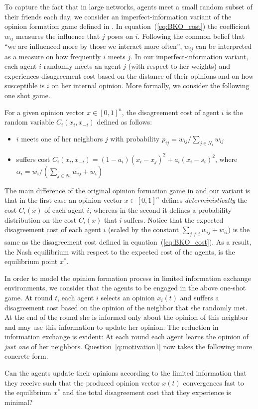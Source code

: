To capture the fact that in large networks, agents meet a small random subset of
their friends each day, we consider an imperfect-information variant of the
opinion formation game defined in \cite{BKO11}. In equation~(\ref{eq:BKO_cost})
the coefficient $w_{ij}$ measures the influence that $j$ poses on $i$.
Following the common belief that \enquote{we are influenced more by
those we interact more often}, $w_{ij}$ can be interpreted as
a measure on how frequently $i$ meets $j$. In our imperfect-information
variant, each agent $i$ randomly meets an agent $j$ (with respect to her weights)
and experiences disagreement cost based on the distance of their opinions and on
how susceptible is $i$ on her internal opinion. More formally, we consider the
following one shot game.
%
\begin{definition}\label{d:random_game}
  For a given opinion vector $x \in [0,1]^n$, the disagreement cost of agent $i$
  is the random variable $C_i(x_i,x_{-i})$ defined as follows:
  \begin{itemize}
    \item $i$ meets one of her neighbors $j$ with probability
      $p_{ij}= w_{ij}/\sum_{j\in N_i}w_{ij}$
    \item suffers cost $C_i(x_i , x_{-i}) = (1-a_i)(x_i-x_j)^2 + a_i(x_i-s_i)^2$,
      where $\alpha_i = w_i/(\sum_{j\in N_i}w_{ij}+w_i)$
  \end{itemize}
\end{definition}
%
The main difference of the original opinion formation game in \cite{BKO11}
and our variant is that in the first case an opinion vector $x\in [0,1]^n$ defines
\emph{deterministically} the cost $C_i(x)$ of each agent $i$,
whereas in the second it defines a probability distribution on the cost
$C_i(x)$ that $i$ suffers. Notice that the expected
disagreement cost of each agent $i$ (scaled by the constant $\sum_{j\neq i}w_{ij}+w_{ii}$)
is the same as the disagreement cost defined in equation~(\ref{eq:BKO_cost}).
As a result, the Nash equilibrium with respect to the expected cost of the agents,
is the equilibrium point $x^*$.

In order to model the opinion formation process in limited information
exchange environments, we consider that the agents to be engaged in the
above one-shot game. At round $t$, each agent $i$ selects an opinion
$x_i(t)$ and suffers a disagreement cost based on the opinion
of the neighbor that she randomly met. At the end of the round she is
informed only about the opinion of this neighbor and may use this information
to update her opinion. The reduction in information exchange is evident:
At each round each agent learns the opinion of \emph{just one} of her neighbors.
Question~\ref{q:motivation1} now takes the following more concrete form.
\begin{question}\label{q:motivation2}
Can the agents update their opinions according to the
limited information that they receive such that the produced opinion vector
$x(t)$ convergences fast to the equilibrium $x^*$ and the total disagreement cost
that they experience is minimal?
\end{question}

